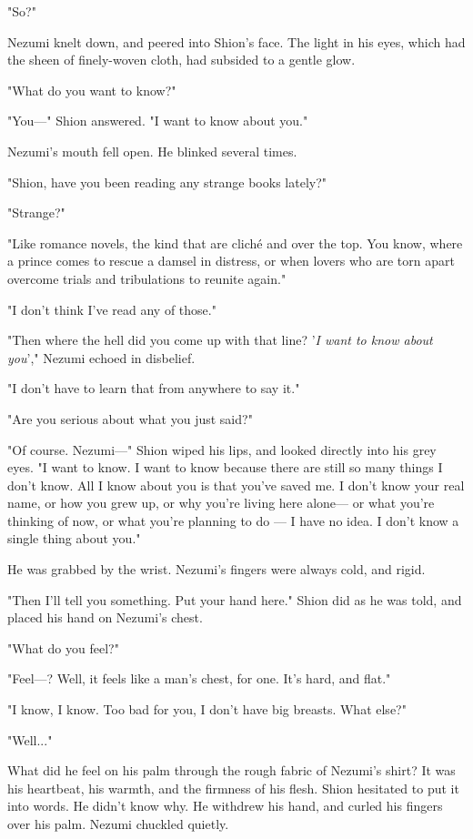 "So?"

Nezumi knelt down, and peered into Shion's face. The light in his eyes,
which had the sheen of finely-woven cloth, had subsided to a gentle
glow.

"What do you want to know?"

"You---" Shion answered. "I want to know about you."

Nezumi's mouth fell open. He blinked several times.

"Shion, have you been reading any strange books lately?"

"Strange?"

"Like romance novels, the kind that are cliché and over the top. You
know, where a prince comes to rescue a damsel in distress, or when
lovers who are torn apart overcome trials and tribulations to reunite
again."

"I don't think I've read any of those."

"Then where the hell did you come up with that line? '\emph{I want to know
about you}'," Nezumi echoed in disbelief.

"I don't have to learn that from anywhere to say it."

"Are you serious about what you just said?"

"Of course. Nezumi---" Shion wiped his lips, and looked directly into his
grey eyes. "I want to know. I want to know because there are still so
many things I don't know. All I know about you is that you've saved me.
I don't know your real name, or how you grew up, or why you're living
here alone--- or what you're thinking of now, or what you're planning to
do --- I have no idea. I don't know a single thing about you."

He was grabbed by the wrist. Nezumi's fingers were always cold, and
rigid.

"Then I'll tell you something. Put your hand here." Shion did as he was
told, and placed his hand on Nezumi's chest.

"What do you feel?"

"Feel---? Well, it feels like a man's chest, for one. It's hard, and
flat."

"I know, I know. Too bad for you, I don't have big breasts. What else?"

"Well..."

What did he feel on his palm through the rough fabric of Nezumi's shirt?
It was his heartbeat, his warmth, and the firmness of his flesh. Shion
hesitated to put it into words. He didn't know why. He withdrew his
hand, and curled his fingers over his palm. Nezumi chuckled quietly.

